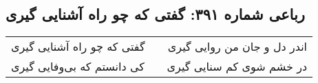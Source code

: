 \begin{center}
\section*{رباعی شماره ۳۹۱: گفتی که چو راه آشنایی گیری}
\label{sec:sh391}
\begin{longtable}{l p{0.5cm} r}
گفتی که چو راه آشنایی گیری
&&
اندر دل و جان من روایی گیری
\\
کی دانستم که بی‌وفایی گیری
&&
در خشم شوی کم سنایی گیری
\\
\end{longtable}
\end{center}
